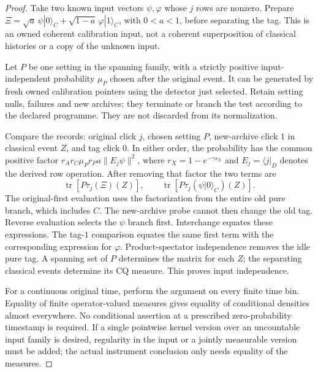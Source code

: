 \documentclass[11pt,oneside,openany]{book}
\theoremstyle{definition}
\theoremstyle{remark}\newtheorem{remark}[theorem]{Remark}
\begin{document}
\begin{proof}
Take two known input vectors $\psi,\varphi$ whose $j$ rows are nonzero.
Prepare $\Xi=\sqrt a\,\psi|0\rangle_C+
\sqrt{1-a}\,\varphi|1\rangle_C$, with $0<a<1$, before separating
the tag. This is an owned coherent calibration input, not a coherent
superposition of classical histories or a copy of the unknown input.

Let $P$ be one setting in the spanning family, with a strictly positive
input-independent probability $\mu_P$ chosen after the original event.
It can be generated by fresh owned calibration pointers using the
detector just selected. Retain setting nulls, failures and new archives;
they terminate or branch the test according to the declared programme.
They are not discarded from its normalization.

Compare the records: original click $j$, chosen setting $P$, new-archive
click $1$ in classical event $Z$, and tag click $0$. In either order,
the probability has the common positive factor
$r_A r_C\mu_P r_P a\|E_j\psi\|^2$, where
$r_X=1-e^{-\gamma s_X}$ and $E_j=\langle j|_D$ denotes the derived
row operation. After removing that factor the two terms are
\[
 \operatorname{tr}[P\tau_j(\Xi)(Z)],\qquad
 \operatorname{tr}[P\tau_j(\psi|0\rangle_C)(Z)].
\]
The original-first evaluation uses the factorization from the entire
old pure branch, which includes $C$. The new-archive probe cannot then
change the old tag. Reverse evaluation selects the $\psi$ branch first.
Interchange equates these expressions. The tag-$1$ comparison equates
the same first term with the corresponding expression for $\varphi$.
Product-spectator independence removes the idle pure tag. A spanning
set of $P$ determines the matrix for each $Z$; the separating classical
events determine its CQ measure. This proves input independence.

For a continuous original time, perform the argument on every finite
time bin. Equality of finite operator-valued measures gives equality
of conditional densities almost everywhere. No conditional assertion
at a prescribed zero-probability timestamp is required. If a single
pointwise kernel version over an uncountable input family is desired,
regularity in the input or a jointly measurable version must be added;
the actual instrument conclusion only needs equality of the measures.
\end{proof}
\end{document}
